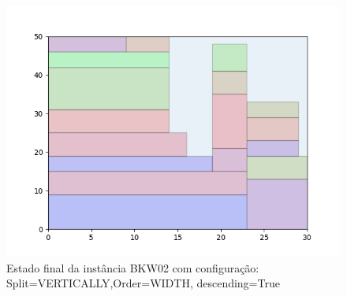 \begin{figure}[H]
    \centering
    \caption[]{Estado final da instância BKW02 com configuração: Split=VERTICALLY,Order=WIDTH, descending=True}
    \label{fig:bkw02-vertically-width-true}
    \includegraphics[scale=0.5]{output/figures/bkw/bkw02/vertically/width/true/00}
\end{figure}